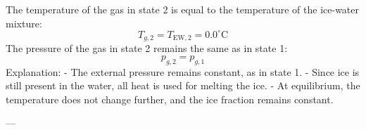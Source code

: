 The temperature of the gas in state 2 is equal to the temperature of the ice-water mixture:  
\[
T_{g,2} = T_{\text{EW},2} = 0.0^\circ\text{C}
\]  
The pressure of the gas in state 2 remains the same as in state 1:  
\[
p_{g,2} = p_{g,1}
\]  
Explanation:  
- The external pressure remains constant, as in state 1.  
- Since ice is still present in the water, all heat is used for melting the ice.  
- At equilibrium, the temperature does not change further, and the ice fraction remains constant.  

---